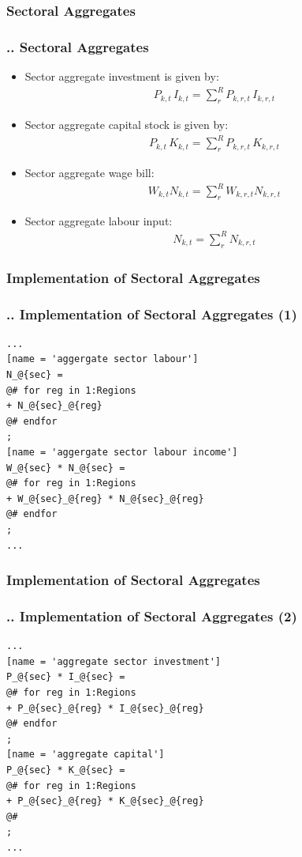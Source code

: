 \documentclass[11pt,aspectratio=169]{beamer}
\begin{document}
\subsubsection{Sectoral Aggregates}
\begin{frame}
\frametitle{{\thesection.\thesubsection.\thesubsubsection} Sectoral Aggregates}
\scriptsize
\begin{itemize}
\item Sector aggregate investment is given by:
\begin{align*}
P_{k,t} \, I_{k,t} = \sum_{r}^{R} P_{k,r,t} \, I_{k,r,t}
\end{align*}
\item Sector aggregate capital stock is given by:
\begin{align*}
P_{k,t} \, K_{k,t} = \sum_{r}^{R} P_{k,r,t} \, K_{k,r,t}
\end{align*}
\item Sector aggregate wage bill:
\begin{align*}
W_{k,t} N_{k,t} = \sum_{r}^{R}  W_{k,r,t} N_{k,r,t}
\end{align*}
\item Sector aggregate labour input:
\begin{align*}
N_{k,t} = \sum_{r}^{R} N_{k,r,t}
\end{align*}
\end{itemize}
\end{frame}

\subsubsection{Implementation of Sectoral Aggregates}
\begin{frame}[fragile]
\frametitle{{\thesection.\thesubsection.\thesubsubsection} Implementation of Sectoral Aggregates (1)}

\begin{lstlisting}[frame = single]
...
[name = 'aggergate sector labour']
N_@{sec} = 
@# for reg in 1:Regions
+ N_@{sec}_@{reg}
@# endfor
;
[name = 'aggergate sector labour income']
W_@{sec} * N_@{sec} = 
@# for reg in 1:Regions
+ W_@{sec}_@{reg} * N_@{sec}_@{reg}
@# endfor
;
...
\end{lstlisting}
\end{frame}

\subsubsection{Implementation of Sectoral Aggregates}
\begin{frame}[fragile]
\frametitle{{\thesection.\thesubsection.\thesubsubsection} Implementation of Sectoral Aggregates (2)}

\begin{lstlisting}[frame = single]
...
[name = 'aggregate sector investment']
P_@{sec} * I_@{sec} = 
@# for reg in 1:Regions
+ P_@{sec}_@{reg} * I_@{sec}_@{reg}
@# endfor
;
[name = 'aggregate capital']
P_@{sec} * K_@{sec} = 
@# for reg in 1:Regions
+ P_@{sec}_@{reg} * K_@{sec}_@{reg}
@#
;
...
\end{lstlisting}
\end{frame}
\end{document}
